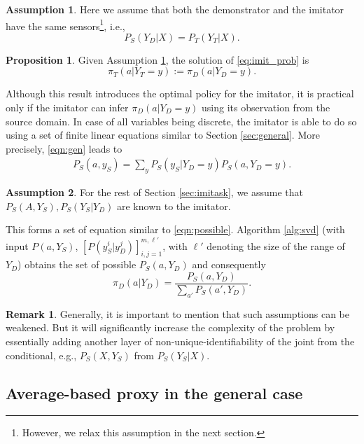 \documentclass[letterpaper]{article} %
\theoremstyle{definition}%
\theoremstyle{definition}
\newtheorem{proposition}{Proposition}
\newtheorem{assumption}{Assumption} %
\newtheorem{remark}{Remark}
\newcommand{\Obs}{Y}
\newcommand{\obs}{y}
\begin{document}
\begin{assumption}\label{ass:im1}
Here we assume that both the demonstrator and the imitator have the same sensors\footnote{However, we relax this assumption in the next section.}, i.e., 
$$
P_S(\Obs_D|X) = P_T(\Obs_T|X).
$$
\end{assumption}
\begin{proposition}\label{pro:imi1}
Given Assumption \ref{ass:im1}, the solution of \eqref{eq:imit_prob} is 
$$
\pi_T(a|\Obs_T=\obs) := \pi_D(a|\Obs_D=\obs).
$$
\end{proposition}
Although this result introduces the optimal policy for the imitator, it is practical only if the imitator can infer $\pi_D(a|\Obs_D=\obs)$ using its observation from the source domain. 
In case of all variables being discrete, the imitator is able to do so using a set of finite linear equations similar to Section \ref{sec:general}. More precisely, 
\eqref{eqn:gen} leads to
\begin{align}\label{eq:cons}
\!\! P_S(a, \obs_S)\! =\!\! \sum_\obs  P_S(\obs_S|\Obs_D=\obs)P_S(a,\Obs_D=\obs).
\end{align}
\begin{assumption}
For the rest of Section \ref{sec:imitask}, we assume that $P_S(A, \Obs_S), P_S(\Obs_S|\Obs_D)$ are known to the imitator.
\end{assumption}
This forms a set of equation similar to \eqref{eqn:possible}. Algorithm \ref{alg:svd} (with input $P(a, Y_S)$, $[P( y_S^i | y_D^j)]_{i,j=1}^{m, \ell'}$, with $\ell'$ denoting the size of the range of $Y_D$) obtains the set of possible $P_S(a,\Obs_D)$ and consequently 
$$
\pi_D(a|\Obs_D)= \frac{P_S(a,\Obs_D)}{\sum_{a'}P_S(a',\Obs_D)}.
$$ 
\begin{remark}
Generally, it is important to mention that such assumptions can be weakened. But it will significantly increase the complexity of the problem by  essentially adding another layer of non-unique-identifiability of the joint from the conditional, e.g., $P_S(X, Y_S)$ from $P_S(Y_S|X)$. 
\end{remark}

\subsection{Average-based proxy in the general case}
\label{sec:imav}
\end{document}
